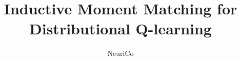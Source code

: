 \documentclass{article}
\title{Inductive Moment Matching for Distributional Q-learning}
\author{NeuriCo}
\begin{document}
\maketitle

\begin{abstract}

\end{abstract}










\end{document}

